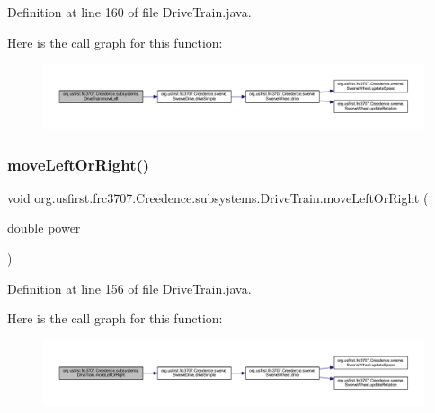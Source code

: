 Definition at line 160 of file Drive\+Train.\+java.

Here is the call graph for this function\+:
\nopagebreak
\begin{figure}[H]
\begin{center}
\leavevmode
\includegraphics[width=350pt]{classorg_1_1usfirst_1_1frc3707_1_1_creedence_1_1subsystems_1_1_drive_train_a1477ebe4464af5feaf76a67513a9063d_cgraph}
\end{center}
\end{figure}
\mbox{\label{classorg_1_1usfirst_1_1frc3707_1_1_creedence_1_1subsystems_1_1_drive_train_aa9afbafaafe780ed7ca59d60a67a6629}} 
\subsubsection{\texorpdfstring{moveLeftOrRight()}{moveLeftOrRight()}}
{\footnotesize\ttfamily void org.\+usfirst.\+frc3707.\+Creedence.\+subsystems.\+Drive\+Train.\+move\+Left\+Or\+Right (\begin{DoxyParamCaption}\item[{double}]{power }\end{DoxyParamCaption})}



Definition at line 156 of file Drive\+Train.\+java.

Here is the call graph for this function\+:
\nopagebreak
\begin{figure}[H]
\begin{center}
\leavevmode
\includegraphics[width=350pt]{classorg_1_1usfirst_1_1frc3707_1_1_creedence_1_1subsystems_1_1_drive_train_aa9afbafaafe780ed7ca59d60a67a6629_cgraph}
\end{center}
\end{figure}
\mbox{\label{classorg_1_1usfirst_1_1frc3707_1_1_creedence_1_1subsystems_1_1_drive_train_a42e63c6914b8fb47374339004cfbd229}} 
